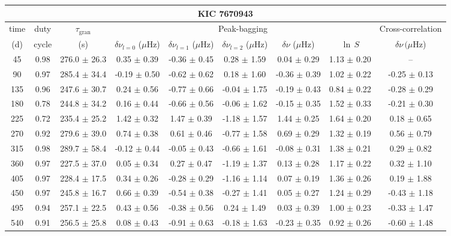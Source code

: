 \documentclass[twocolumn]{aastex61}%
\begin{document}
\begin{table*}[ht]\centering\fontsize{9.}{7.}\selectfont
\begin{tabular}{ccc|ccccc|c}
\multicolumn{9}{c}{KIC 7670943}\\ \hline\hline
time & duty & $\tau_\text{gran}$ &\multicolumn{5}{c|}{Peak-bagging}&Cross-correlation\\
(d)& cycle & (s)&$\delta\nu_{l=0}$ ($\mu$Hz) & $\delta\nu_{l=1}$ ($\mu$Hz) & $\delta\nu_{l=2}$ ($\mu$Hz) & $\delta\nu$ ($\mu$Hz)& $\ln\,S$ & $\delta\nu\,(\mu$Hz)\\\hline
45 & 0.98 & 276.0 $\pm$ 26.3 & 0.35 $\pm$ 0.39 & -0.36 $\pm$ 0.45 & 0.28 $\pm$ 1.59 & 0.04 $\pm$ 0.29 & 1.13 $\pm$ 0.20 & --\\
90 & 0.97 & 285.4 $\pm$ 34.4 & -0.19 $\pm$ 0.50 & -0.62 $\pm$ 0.62 & 0.18 $\pm$ 1.60 & -0.36 $\pm$ 0.39 & 1.02 $\pm$ 0.22 & -0.25 $\pm$ 0.13\\
135 & 0.96 & 247.6 $\pm$ 30.7 & 0.24 $\pm$ 0.56 & -0.77 $\pm$ 0.66 & -0.04 $\pm$ 1.75 & -0.19 $\pm$ 0.43 & 0.84 $\pm$ 0.22 & -0.28 $\pm$ 0.29\\
180 & 0.78 & 244.8 $\pm$ 34.2 & 0.16 $\pm$ 0.44 & -0.66 $\pm$ 0.56 & -0.06 $\pm$ 1.62 & -0.15 $\pm$ 0.35 & 1.52 $\pm$ 0.33 & -0.21 $\pm$ 0.30\\
225 & 0.72 & 235.4 $\pm$ 25.2 & 1.42 $\pm$ 0.32 & 1.47 $\pm$ 0.39 & -1.18 $\pm$ 1.57 & 1.44 $\pm$ 0.25 & 1.64 $\pm$ 0.20 & 0.18 $\pm$ 0.65\\
270 & 0.92 & 279.6 $\pm$ 39.0 & 0.74 $\pm$ 0.38 & 0.61 $\pm$ 0.46 & -0.77 $\pm$ 1.58 & 0.69 $\pm$ 0.29 & 1.32 $\pm$ 0.19 & 0.56 $\pm$ 0.79\\
315 & 0.98 & 289.7 $\pm$ 58.4 & -0.12 $\pm$ 0.44 & -0.05 $\pm$ 0.43 & -0.66 $\pm$ 1.61 & -0.08 $\pm$ 0.31 & 1.38 $\pm$ 0.21 & 0.29 $\pm$ 0.82\\
360 & 0.97 & 227.5 $\pm$ 37.0 & 0.05 $\pm$ 0.34 & 0.27 $\pm$ 0.47 & -1.19 $\pm$ 1.37 & 0.13 $\pm$ 0.28 & 1.17 $\pm$ 0.22 & 0.32 $\pm$ 1.10\\
405 & 0.97 & 228.4 $\pm$ 17.5 & 0.34 $\pm$ 0.26 & -0.28 $\pm$ 0.29 & -1.16 $\pm$ 1.14 & 0.07 $\pm$ 0.19 & 1.36 $\pm$ 0.26 & 0.19 $\pm$ 1.88\\
450 & 0.97 & 245.8 $\pm$ 16.7 & 0.66 $\pm$ 0.39 & -0.54 $\pm$ 0.38 & -0.27 $\pm$ 1.41 & 0.05 $\pm$ 0.27 & 1.24 $\pm$ 0.29 & -0.43 $\pm$ 1.18\\
495 & 0.94 & 257.1 $\pm$ 22.5 & 0.43 $\pm$ 0.56 & -0.38 $\pm$ 0.56 & 0.24 $\pm$ 1.49 & 0.03 $\pm$ 0.39 & 1.00 $\pm$ 0.23 & -0.33 $\pm$ 1.47\\
540 & 0.91 & 256.5 $\pm$ 25.8 & 0.08 $\pm$ 0.43 & -0.91 $\pm$ 0.63 & -0.18 $\pm$ 1.63 & -0.23 $\pm$ 0.35 & 0.92 $\pm$ 0.26 & -0.60 $\pm$ 1.48\\

\end{tabular}
\end{table*}
\end{document}
